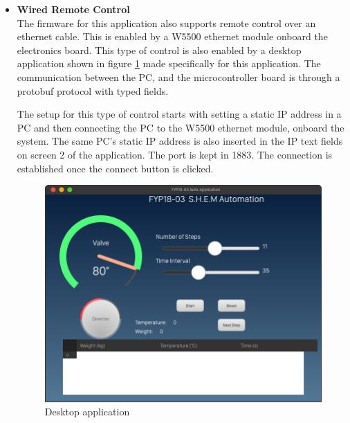 \begin{itemize}
    \item \textbf{Wired Remote Control}\\
    The firmware for this application also supports remote control over an ethernet cable. This is enabled by a W5500 ethernet module onboard the electronics board. This type of control is also enabled by a desktop application shown in figure \ref{fig:desktop_application} made specifically for this application.
    The communication between the PC, and the microcontroller board is through a protobuf protocol with typed fields.
    \par
    The setup for this type of control starts with setting a static IP address in a PC and then connecting the PC to the W5500 ethernet module, onboard the system. The same PC's static IP address is also inserted in the IP text fields on screen 2 of the application.  The port is kept in 1883. The connection is established once the connect button is clicked.
    \begin{figure}[H]
        \centering
        \includegraphics[width=\textwidth]{Figures/desktop_v1.png}
        \caption{Desktop application }
        \label{fig:desktop_application}
    \end{figure}
\end{itemize}